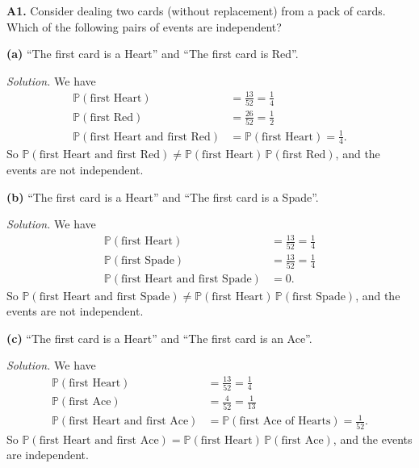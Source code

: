 \documentclass[
  a4paper,
]{book}
\theoremstyle{definition}
\theoremstyle{definition}
\theoremstyle{definition}
\theoremstyle{definition}
\theoremstyle{remark}
\begin{document}
\textbf{A1.} Consider dealing two cards (without replacement) from a pack of cards. Which of the following pairs of events are independent?

\textbf{(a)} ``The first card is a Heart'' and ``The first card is Red''.

\begin{myanswers}
\emph{Solution.}
We have
\begin{align*}
\mathbb P(\text{first Heart}) &= \frac{13}{52} = \frac14 \\
\mathbb P(\text{first Red}) &= \frac{26}{52} = \frac12 \\
\mathbb P(\text{first Heart and first Red}) &= \mathbb P(\text{first Heart}) = \frac14 .
\end{align*}
So \(\mathbb P(\text{first Heart and first Red}) \neq \mathbb P(\text{first Heart})\,\mathbb P(\text{first Red})\), and the events are not independent.

\end{myanswers}

\textbf{(b)} ``The first card is a Heart'' and ``The first card is a Spade''.

\begin{myanswers}
\emph{Solution.}
We have
\begin{align*}
\mathbb P(\text{first Heart}) &= \frac{13}{52} = \frac14 \\
\mathbb P(\text{first Spade}) &= \frac{13}{52} = \frac14 \\
\mathbb P(\text{first Heart and first Spade}) &= 0 .
\end{align*}
So \(\mathbb P(\text{first Heart and first Spade}) \neq \mathbb P(\text{first Heart})\,\mathbb P(\text{first Spade})\), and the events are not independent.

\end{myanswers}

\textbf{(c)} ``The first card is a Heart'' and ``The first card is an Ace''.

\begin{myanswers}
\emph{Solution.}
We have
\begin{align*}
\mathbb P(\text{first Heart}) &= \frac{13}{52} = \frac14 \\
\mathbb P(\text{first Ace}) &= \frac{4}{52} = \frac1{13} \\
\mathbb P(\text{first Heart and first Ace}) &= \mathbb P(\text{first Ace of Hearts}) = \frac1{52} .
\end{align*}
So \(\mathbb P(\text{first Heart and first Ace}) = \mathbb P(\text{first Heart})\,\mathbb P(\text{first Ace})\), and the events are independent.

\end{myanswers}
\end{document}
